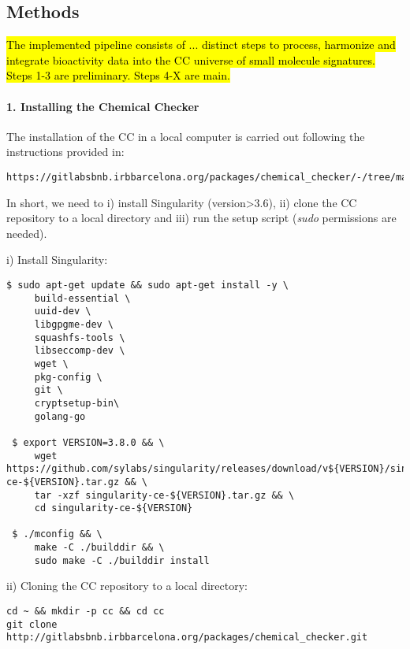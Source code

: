\subsection{Methods}
\label{Protocols_Methods}

\hl{The implemented pipeline consists of ... distinct steps to process, harmonize and integrate bioactivity data into the CC universe of small molecule signatures. Steps 1-3 are preliminary. Steps 4-X are main.}

\paragraph{1. Installing the Chemical Checker} \leavevmode

The installation of the CC in a local computer is carried out following the instructions provided in: \\

\begin{lstlisting}
https://gitlabsbnb.irbbarcelona.org/packages/chemical_checker/-/tree/master
\end{lstlisting}

In short, we need to i) install Singularity (version>3.6), ii) clone the CC repository to a local directory and iii) run the setup script (\textit{sudo} permissions are needed).

i) Install Singularity: \\

\begin{lstlisting}
$ sudo apt-get update && sudo apt-get install -y \
     build-essential \
     uuid-dev \
     libgpgme-dev \
     squashfs-tools \
     libseccomp-dev \
     wget \
     pkg-config \
     git \
     cryptsetup-bin\
     golang-go

 $ export VERSION=3.8.0 && \
     wget https://github.com/sylabs/singularity/releases/download/v${VERSION}/singularity-ce-${VERSION}.tar.gz && \
     tar -xzf singularity-ce-${VERSION}.tar.gz && \
     cd singularity-ce-${VERSION}

 $ ./mconfig && \
     make -C ./builddir && \
     sudo make -C ./builddir install
\end{lstlisting}

ii) Cloning the CC repository to a local directory: \\

\begin{lstlisting}
cd ~ && mkdir -p cc && cd cc
git clone http://gitlabsbnb.irbbarcelona.org/packages/chemical_checker.git
\end{lstlisting}

